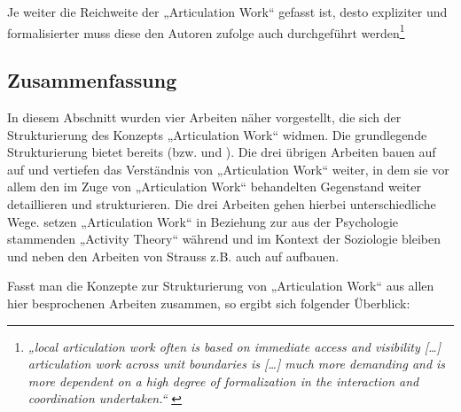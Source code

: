 Je weiter die Reichweite der „Articulation Work“ gefasst ist, desto expliziter und formalisierter muss diese den Autoren zufolge auch durchgeführt werden\footnote{\emph{„local articulation work often is based on immediate access and visibility [\ldots] articulation work across unit boundaries is [\ldots] much more demanding and is more dependent on a high degree of formalization in the interaction and coordination undertaken.“} \citep[][S. 178f]{Faergemann05}}


\subsection{Zusammenfassung} %
\label{sub:aw_zusammenfassung}

In diesem Abschnitt wurden vier Arbeiten näher vorgestellt, die sich der  Strukturierung des Konzepts „Articulation Work“ widmen. Die grundlegende Strukturierung bietet bereits \citet{Strauss85} (bzw. \citet{Strauss88} und \citet{Strauss93}). Die drei übrigen Arbeiten bauen auf \citeauthor{Strauss85} auf und vertiefen das Verständnis von „Articulation Work“ weiter, in dem sie vor allem den im Zuge von „Articulation Work“ behandelten Gegenstand weiter detaillieren und strukturieren. Die drei Arbeiten gehen hierbei unterschiedliche Wege. \citet{Fjuk97} setzen „Articulation Work“ in Beziehung zur aus der Psychologie stammenden „Activity Theory“ während \citet{Hampson05} und \citet{Faergemann05} im Kontext der Soziologie bleiben und neben den Arbeiten von Strauss z.B. auch auf \citep{Star99} aufbauen. 

Fasst man die Konzepte zur Strukturierung von „Articulation Work“ aus allen hier besprochenen Arbeiten zusammen, so ergibt sich folgender Überblick: 

